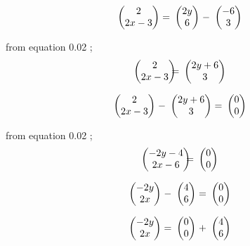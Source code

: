 \documentclass[journal,12pt,twocolumn]{IEEEtran}
\theoremstyle{remark}
\newcommand{\myvec}[1]{\ensuremath{\begin{pmatrix}#1\end{pmatrix}}}
\numberwithin{equation}{subsection}
\begin{document}
      \vspace{1cm}
         \begin{align}
&\ \myvec{2\\2x-3 }& \hspace{-0.25cm} =
&\ \myvec{2y\\6} & \hspace{-0.25cm}- 
&\ \myvec{-6\\3} &
\end{align} 
      
       \vspace{1cm}
       from equation 0.02 ;
             \vspace{0.25cm}
      \begin{align}
&\ \myvec{2\\2x-3 }& \hspace{-0.5cm} =
&\ \myvec{2y+6\\3} & 
\end{align} 
      
     \begin{align}
&\ \myvec{2\\2x-3 }& \hspace{-0.25cm} -
&\ \myvec{2y+6\\3} & \hspace{-0.25cm}= 
&\ \myvec{0\\0} &
\end{align} 
      
      \vspace{1cm}
       from equation 0.02 ;
             \vspace{0.25cm}
      \begin{align}
&\ \myvec{-2y-4\\2x-6 }& \hspace{-0.5cm} =
&\ \myvec{0\\0} & 
\end{align} 
      
     \begin{align}
&\ \myvec{-2y\\2x }& \hspace{-0.25cm} -
&\ \myvec{4\\6} & \hspace{-0.25cm}= 
&\ \myvec{0\\0} &
\end{align} 
      

       \begin{align}
&\ \myvec{-2y\\2x }& \hspace{-0.25cm} =
&\ \myvec{0\\0} & \hspace{-0.25cm}+ 
&\ \myvec{4\\6} &
\end{align} 
\end{document}
